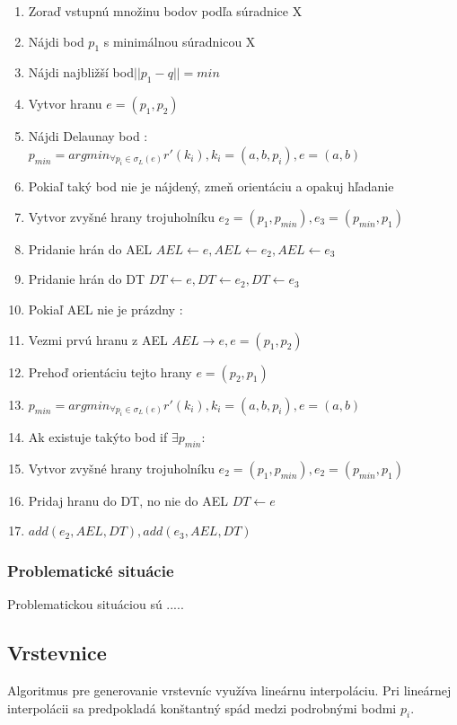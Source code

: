 \documentclass[12pt]{article}
\begin{document}
\begin{enumerate}
\item Zoraď vstupnú množinu bodov podľa súradnice X
\item Nájdi bod $p_1$ s minimálnou súradnicou X 
\item Nájdi najbližší bod$ ||p_1-q|| = min $ 
\item Vytvor hranu $ e = (p_1,p_2) $ 
\item  Nájdi Delaunay bod :  $p_{min} = arg min_{\forall p_i\in\sigma_L(e)} r'(k_i), k_i = (a, b, p_i), e = (a,b)$
\item \hspace {1.5cm} Pokiaľ taký bod nie je nájdený, zmeň orientáciu a opakuj hľadanie
\item Vytvor zvyšné hrany trojuholníku $e_2 = (p_1,p_{min}), e_3 = (p_{min},p_1) $
\item  Pridanie hrán do AEL $ AEL \leftarrow e, AEL  \gets e_2,  AEL \gets e_3 $
\item  Pridanie hrán do DT $ DT \gets e, DT \gets e_2,  DT \gets e_3 $
\item  Pokiaľ AEL nie je prázdny :
\item \hspace {1cm} Vezmi prvú hranu z	 AEL $AEL  \longrightarrow e, e = ( p_1, p_2) $
\item \hspace {1cm} Prehoď orientáciu tejto hrany $ e = (p_2, p_1)$ 
\item \hspace {1cm} $p_{min} = arg min_{\forall p_i\in\sigma_L(e)} r'(k_i), k_i = (a, b, p_i), e = (a,b) $
\item \hspace {1cm} Ak existuje takýto bod if $ \exists p_{min}:$
\item \hspace {1.5cm} Vytvor zvyšné hrany trojuholníku $e_2 = (p_1,p_{min}), e_2 = (p_{min},p_1)  $
\item \hspace {1.5cm} Pridaj hranu do DT, no nie do AEL $DT \longleftarrow e  $  
\item \hspace {1.5cm} $ add(e_2,AEL,DT), add(e_3,AEL,DT)$
\end{enumerate}

\subsubsection {Problematické situácie}
Problematickou situáciou sú .....

\subsection {Vrstevnice}
Algoritmus pre generovanie vrstevníc využíva lineárnu interpoláciu. Pri lineárnej interpolácii sa predpokladá konštantný spád medzi podrobnými bodmi $p_i$.
\end{document}
